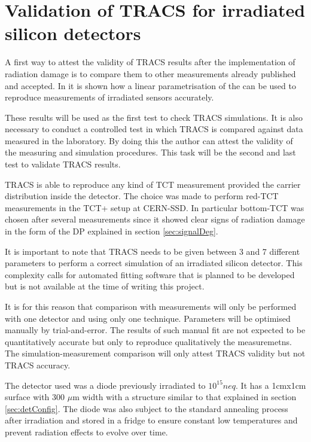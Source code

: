 \chapter{Validation of TRACS for irradiated silicon detectors}
\label{sec:TRACSvalidity}

A first way to attest the validity of TRACS results after the implementation of radiation damage is to compare them to other measurements already published and accepted. In \cite{Pholsen} it is shown how a linear parametrisation of the \neff can be used to reproduce measurements of irradiated sensors accurately.

These results will be used as the first test to check TRACS simulations. It is also necessary to conduct a controlled test in which TRACS is compared against data measured in the laboratory. By doing this the author can attest the validity of the measuring and simulation procedures. This task will be the second and last test to validate TRACS results.

TRACS is able to reproduce any kind of TCT measurement provided the carrier distribution inside the detector. The choice was made to perform red-TCT measurements in the TCT+ setup at CERN-SSD\cite{ssd}. In particular bottom-TCT was chosen after several measurements since it showed clear signs of radiation damage in the form of the DP explained in section \ref{sec:signalDeg}. 

It is important to note that TRACS needs to be given between 3 and 7 different parameters to perform a correct simulation of an irradiated silicon detector. This complexity calls for automated fitting software that is planned to be developed but is not available at the time of writing this project.

It is for this reason that comparison with measurements will only be performed with one detector and using only one technique. Parameters will be optimised manually by trial-and-error. The results of such manual fit are not expected to be quantitatively accurate but only to reproduce qualitatively the measuremetns. The simulation-measurement comparison will only attest TRACS validity but not TRACS accuracy.

The detector used was a diode previously irradiated to $10^{15} neq$. It has a  1cmx1cm surface with 300 $\mu$m width with a structure similar to that explained in section \ref{sec:detConfig}. The diode was also subject to the standard annealing process after irradiation and stored in a fridge to ensure constant low temperatures and prevent radiation effects to evolve over time. 



